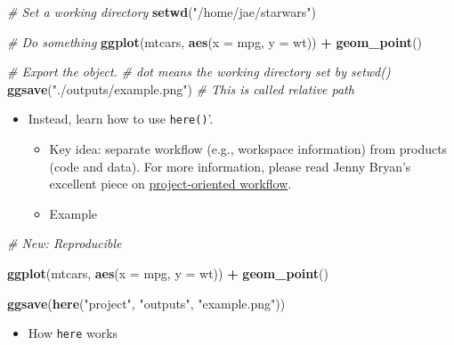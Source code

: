 \documentclass[
]{book}
\newenvironment{Shaded}{\begin{snugshade}}{\end{snugshade}}
\newcommand{\AttributeTok}[1]{\textcolor[rgb]{0.13,0.29,0.53}{#1}}
\newcommand{\CommentTok}[1]{\textcolor[rgb]{0.56,0.35,0.01}{\textit{#1}}}
\newcommand{\FunctionTok}[1]{\textcolor[rgb]{0.13,0.29,0.53}{\textbf{#1}}}
\newcommand{\NormalTok}[1]{#1}
\newcommand{\SpecialCharTok}[1]{\textcolor[rgb]{0.81,0.36,0.00}{\textbf{#1}}}
\newcommand{\StringTok}[1]{\textcolor[rgb]{0.31,0.60,0.02}{#1}}
\providecommand{\tightlist}{%
  \setlength{\itemsep}{0pt}\setlength{\parskip}{0pt}}
\begin{document}
\begin{Shaded}
\begin{Highlighting}[]
\CommentTok{\# Set a working directory}
\FunctionTok{setwd}\NormalTok{(}\StringTok{"/home/jae/starwars"}\NormalTok{)}

\CommentTok{\# Do something}
\FunctionTok{ggplot}\NormalTok{(mtcars, }\FunctionTok{aes}\NormalTok{(}\AttributeTok{x =}\NormalTok{ mpg, }\AttributeTok{y =}\NormalTok{ wt)) }\SpecialCharTok{+}
   \FunctionTok{geom\_point}\NormalTok{()}

\CommentTok{\# Export the object.}
\CommentTok{\# dot means the working directory set by setwd()}
\FunctionTok{ggsave}\NormalTok{(}\StringTok{"./outputs/example.png"}\NormalTok{) }\CommentTok{\# This is called relative path}
\end{Highlighting}
\end{Shaded}

\begin{itemize}
\item
  Instead, learn how to use \texttt{here()}'.

  \begin{itemize}
  \item
    Key idea: separate workflow (e.g., workspace information) from products (code and data). For more information, please read Jenny Bryan's excellent piece on \href{https://www.tidyverse.org/blog/2017/12/workflow-vs-script/}{project-oriented workflow}.
  \item
    Example
  \end{itemize}
\end{itemize}

\begin{Shaded}
\begin{Highlighting}[]
\CommentTok{\# New: Reproducible}

\FunctionTok{ggplot}\NormalTok{(mtcars, }\FunctionTok{aes}\NormalTok{(}\AttributeTok{x =}\NormalTok{ mpg, }\AttributeTok{y =}\NormalTok{ wt)) }\SpecialCharTok{+}
   \FunctionTok{geom\_point}\NormalTok{()}

\FunctionTok{ggsave}\NormalTok{(}\FunctionTok{here}\NormalTok{(}\StringTok{"project"}\NormalTok{, }\StringTok{"outputs"}\NormalTok{, }\StringTok{"example.png"}\NormalTok{))}
\end{Highlighting}
\end{Shaded}

\begin{itemize}
\tightlist
\item
  How \texttt{here} works
\end{itemize}
\end{document}

